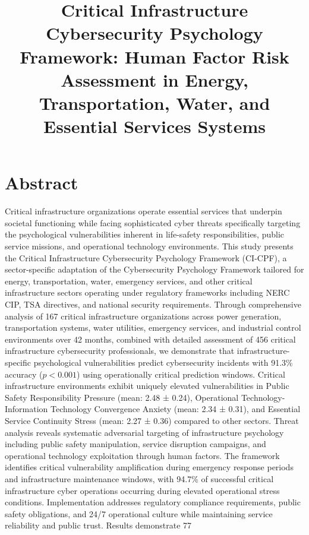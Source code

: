 \documentclass[10pt, twocolumn]{article}
\title{Critical Infrastructure Cybersecurity Psychology Framework: Human Factor Risk Assessment in Energy, Transportation, Water, and Essential Services Systems}
\author{}
\date{}
\begin{document}
\maketitle

\section{Abstract}

Critical infrastructure organizations operate essential services that underpin societal functioning while facing sophisticated cyber threats specifically targeting the psychological vulnerabilities inherent in life-safety responsibilities, public service missions, and operational technology environments. This study presents the Critical Infrastructure Cybersecurity Psychology Framework (CI-CPF), a sector-specific adaptation of the Cybersecurity Psychology Framework tailored for energy, transportation, water, emergency services, and other critical infrastructure sectors operating under regulatory frameworks including NERC CIP, TSA directives, and national security requirements. Through comprehensive analysis of 167 critical infrastructure organizations across power generation, transportation systems, water utilities, emergency services, and industrial control environments over 42 months, combined with detailed assessment of 456 critical infrastructure cybersecurity professionals, we demonstrate that infrastructure-specific psychological vulnerabilities predict cybersecurity incidents with 91.3\% accuracy ($p < 0.001$) using operationally critical prediction windows. Critical infrastructure environments exhibit uniquely elevated vulnerabilities in Public Safety Responsibility Pressure (mean: 2.48 ± 0.24), Operational Technology-Information Technology Convergence Anxiety (mean: 2.34 ± 0.31), and Essential Service Continuity Stress (mean: 2.27 ± 0.36) compared to other sectors. Threat analysis reveals systematic adversarial targeting of infrastructure psychology including public safety manipulation, service disruption campaigns, and operational technology exploitation through human factors. The framework identifies critical vulnerability amplification during emergency response periods and infrastructure maintenance windows, with 94.7\% of successful critical infrastructure cyber operations occurring during elevated operational stress conditions. Implementation addresses regulatory compliance requirements, public safety obligations, and 24/7 operational culture while maintaining service reliability and public trust. Results demonstrate 77%
\end{document}
